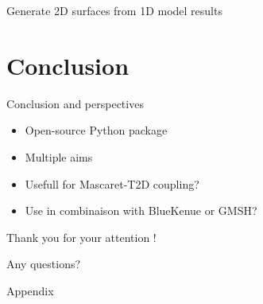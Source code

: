 \documentclass[10pt]{beamer}
\begin{document}
\begin{frame}{Generate 2D surfaces from 1D model results}
\end{frame}


\section{Conclusion}

\begin{frame}{Conclusion and perspectives}

\begin{itemize}
    \item Open-source Python package
    \item Multiple aims
    \item Usefull for Mascaret-T2D coupling?
    \item Use in combinaison with BlueKenue or GMSH?
\end{itemize}

\end{frame}


{
  \begin{frame}[c,noframenumbering]{}
    \begin{center}
          {\Large
        Thank you for your attention !

        \vspace{2cm}

        Any questions?
        }
    \end{center}
  \end{frame}
}


\lastframe


\appendix

{
  \begin{frame}[c,noframenumbering]{\LARGE Appendix}
  \end{frame}
}
\end{document}
